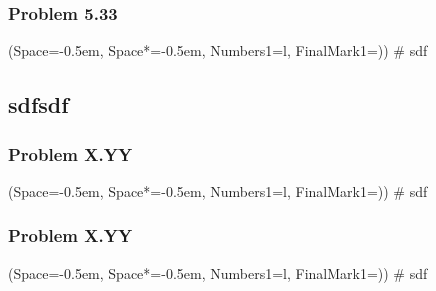\documentclass[12pt, a4paper]{article}
\newcommand{\listSpace}{-0.5em}%
\begin{document}
\subsubsection*{Problem 5.33}
\begin{easylist}[enumerate]
	\ListProperties(Space=\listSpace, Space*=\listSpace, Numbers1=l, FinalMark1={)})
	# sdf
\end{easylist}





























\subsection{sdfsdf}

\subsubsection*{Problem X.YY}
\begin{easylist}[enumerate]
	\ListProperties(Space=\listSpace, Space*=\listSpace, Numbers1=l, FinalMark1={)})
	# sdf
\end{easylist}

\subsubsection*{Problem X.YY}
\begin{easylist}[enumerate]
	\ListProperties(Space=\listSpace, Space*=\listSpace, Numbers1=l, FinalMark1={)})
	# sdf
\end{easylist}
\end{document}
